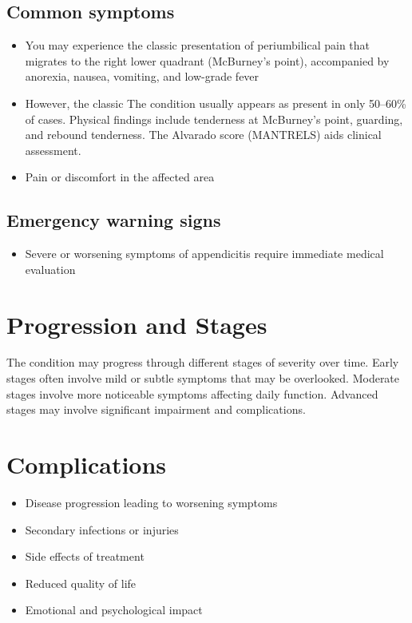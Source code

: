 \subsection{Common symptoms}
\begin{itemize}[noitemsep]
  \item You may experience the classic presentation of periumbilical pain that migrates to the right lower quadrant (McBurney's point), accompanied by anorexia, nausea, vomiting, and low-grade fever
  \item However, the classic The condition usually appears as present in only 50--60\% of cases. Physical findings include tenderness at McBurney's point, guarding, and rebound tenderness. The Alvarado score (MANTRELS) aids clinical assessment.
  \item Pain or discomfort in the affected area
  \end{itemize}

\subsection{Emergency warning signs}
\begin{itemize}[noitemsep]
  \item Severe or worsening symptoms of appendicitis require immediate medical evaluation
\end{itemize}
\section{Progression and Stages}
The condition may progress through different stages of severity over time. Early stages often involve mild or subtle symptoms that may be overlooked. Moderate stages involve more noticeable symptoms affecting daily function. Advanced stages may involve significant impairment and complications.
\section{Complications}
\begin{itemize}[noitemsep]
  \item Disease progression leading to worsening symptoms
  \item Secondary infections or injuries
  \item Side effects of treatment
  \item Reduced quality of life
  \item Emotional and psychological impact
\end{itemize}
